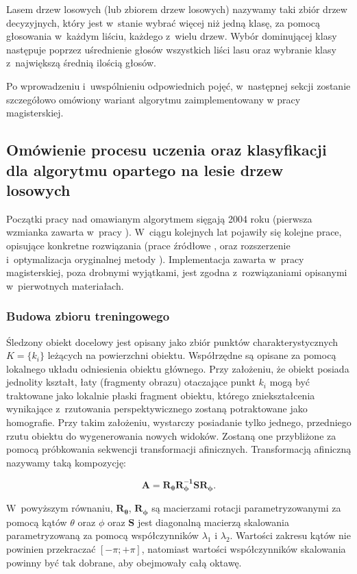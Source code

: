     Lasem drzew losowych (lub zbiorem drzew losowych) nazywamy taki zbiór drzew decyzyjnych, który jest w~stanie wybrać więcej niż jedną klasę, za pomocą głosowania w~każdym liściu, każdego z~wielu drzew. Wybór dominującej klasy następuje poprzez uśrednienie głosów wszystkich liści lasu oraz wybranie klasy z~największą średnią ilością głosów.

    Po wprowadzeniu i~uwspólnieniu odpowiednich pojęć, w~następnej sekcji zostanie szczegółowo omówiony wariant algorytmu zaimplementowany w pracy magisterskiej.

    \subsection{Omówienie procesu uczenia oraz klasyfikacji dla algorytmu opartego na lesie drzew losowych}
    Początki pracy nad omawianym algorytmem sięgają 2004 roku (pierwsza wzmianka zawarta w~pracy \cite{RecognizingFeaturePointsUsingClassificationTrees04}). W~ciągu kolejnych lat pojawiły się kolejne prace, opisujące konkretne rozwiązania (prace źródłowe \cite{RealTimeRandomizedTrees05}, \cite{RandomizedTrees06} oraz rozszerzenie i~optymalizacja oryginalnej metody \cite{TwoStageRandomizedTrees11}). Implementacja zawarta w~pracy magisterskiej, poza drobnymi wyjątkami, jest zgodna z~rozwiązaniami opisanymi w~pierwotnych materiałach.

    \subsubsection{Budowa zbioru treningowego}
    Śledzony obiekt docelowy jest opisany jako zbiór punktów charakterystycznych $K = \{k_{i}\}$ leżących na powierzchni obiektu. Współrzędne są opisane za pomocą lokalnego układu odniesienia obiektu głównego. Przy założeniu, że obiekt posiada jednolity kształt, łaty (fragmenty obrazu) otaczające punkt $k_{i}$ mogą być traktowane jako lokalnie płaski fragment obiektu, którego zniekształcenia wynikające z~rzutowania perspektywicznego zostaną potraktowane jako homografie. Przy takim założeniu, wystarczy posiadanie tylko jednego, przedniego rzutu obiektu do wygenerowania nowych widoków. Zostaną one przybliżone za pomocą próbkowania sekwencji transformacji afinicznych. Transformacją afiniczną nazywamy taką kompozycję:

    \[
      \mathbf{A} = \mathbf{R_{\theta}}\mathbf{R_{\phi}^{-1}}\mathbf{S}\mathbf{R_{\phi}}.
    \]

    W~powyższym równaniu, $\mathbf{R_{\theta}}$, $\mathbf{R_{\phi}}$ są macierzami rotacji parametryzowanymi za pomocą kątów $\theta$ oraz $\phi$ oraz $\mathbf{S}$ jest diagonalną macierzą skalowania parametryzowaną za pomocą współczynników $\lambda_{1}$ i $\lambda_{2}$. Wartości zakresu kątów nie powinien przekraczać $[-\pi;+\pi]$, natomiast wartości współczynników skalowania powinny być tak dobrane, aby obejmowały całą oktawę.

